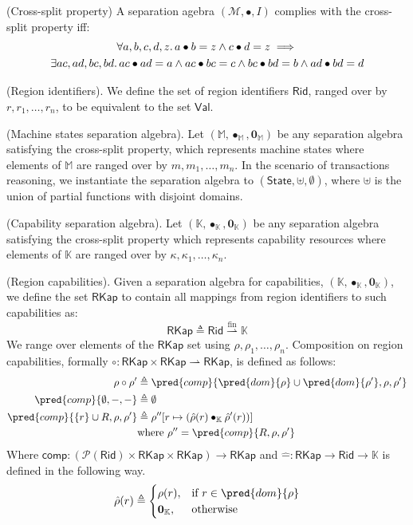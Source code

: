  (Cross-split property) A separation agebra $(\mathcal{M}, \bullet, I)$ complies with the cross-split property iff:
\begin{gather*}
	\forall a, b, c, d, z \ldotp a \bullet b = z \land c \bullet d = z \implies \\ \exists ac, ad, bc, bd \ldotp ac \bullet ad = a \land ac \bullet bc = c \land bc \bullet bd = b \land ad \bullet bd = d
\end{gather*}

 (Region identifiers). We define the set of region identifiers $\mathsf{Rid}$, ranged over by $r, r_1, \ldots, r_n$, to be equivalent to the set $\mathsf{Val}$.

\param (Machine states separation algebra). Let $(\mathbb{M}, \bullet_\mathbb{M}, \mathbf{0}_\mathbb{M})$ be any separation algebra satisfying the cross-split property, which represents machine states where elements of $\mathbb{M}$ are ranged over by $m, m_1, \ldots, m_n$. In the scenario of transactions reasoning, we instantiate the separation algebra to $(\mathsf{State}, \uplus, \emptyset)$, where $\uplus$ is the union of partial functions with disjoint domains.

\param (Capability separation algebra). Let $(\mathbb{K}, \bullet_\mathbb{K}, \mathbf{0}_\mathbb{K})$ be any separation algebra satisfying the cross-split property which represents capability resources where elements of $\mathbb{K}$ are ranged over by $\kappa, \kappa_1, \ldots, \kappa_n$.

 (Region capabilities). Given a separation algebra for capabilities, $(\mathbb{K}, \bullet_\mathbb{K}, \mathbf{0}_\mathbb{K})$, we define the set $\mathsf{RKap}$ to contain all mappings from region identifiers to such capabilities as:
\[
	\mathsf{RKap} \triangleq \mathsf{Rid} \overset{\text{fin}}{\rightharpoonup} \mathbb{K}
\]
We range over elements of the $\mathsf{RKap}$ set using $\rho, \rho_1, \ldots, \rho_n$. Composition on region capabilities, formally $\circ : \mathsf{RKap} \times \mathsf{RKap} \rightharpoonup \mathsf{RKap}$, is defined as follows:
\begin{align*}
	\rho \circ \rho' &\triangleq \pred{comp}{\pred{dom}{\rho} \cup \pred{dom}{\rho'}, \rho, \rho'}
	\\
	\pred{comp}{\emptyset, -, -} &\triangleq \emptyset
	\\
	\pred{comp}{\{r\} \cup R, \rho, \rho'} &\triangleq \rho''[r \mapsto (\hat{\rho}(r) \bullet_\mathbb{K} \hat{\rho}'(r))]
	\\ &\text{where } \rho'' = \pred{comp}{R, \rho, \rho'}
\end{align*}
Where $\mathsf{comp} : \left( \mathcal{P}(\mathsf{Rid}) \times \mathsf{RKap} \times \mathsf{RKap} \right) \rightarrow \mathsf{RKap}$ and $\hat{-} : \mathsf{RKap} \rightarrow \mathsf{Rid} \rightarrow \mathbb{K}$ is defined in the following way.
\[
	\hat{\rho}(r) \triangleq
		\begin{cases}
			\rho(r), & \text{if } r \in \pred{dom}{\rho}
			\\
			\mathbf{0}_\mathbb{K}, & \text{otherwise}
		\end{cases}
\]

